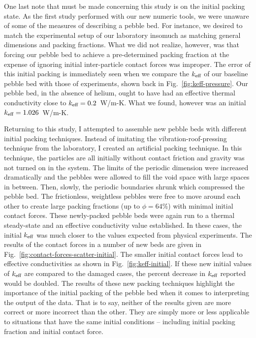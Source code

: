 One last note that must be made concerning this study is on the initial packing state. As the first study performed with our new numeric tools, we were unaware of some of the measures of describing a pebble bed. For instance, we desired to match the experimental setup of our laboratory insomuch as matching general dimensions and packing fractions. What we did not realize, however, was that forcing our pebble bed to achieve a pre-determined packing fraction at the expense of ignoring initial inter-particle contact forces was improper. The error of this initial packing is immediately seen when we compare the $k_\text{eff}$ of our baseline pebble bed with those of experiments, shown back in Fig.~\ref{fig:keff-pressure}. Our pebble bed, in the absence of helium, ought to have had an effective thermal conductivity close to $k_\text{eff} = 0.2$~W/m-K. What we found, however was an initial $k_\text{eff} = 1.026$~W/m-K.

Returning to this study, I attempted to assemble new pebble beds with different initial packing techniques. Instead of imitating the vibration-roof-pressing technique from the laboratory, I created an artificial packing technique. In this technique, the particles are all initially without contact friction and gravity was not turned on in the system. The limits of the periodic dimension were increased dramatically and the pebbles were allowed to fill the void space with large spaces in between. Then, slowly, the periodic boundaries shrunk which compressed the pebble bed. The frictionless, weightless pebbles were free to move around each other to create large packing fractions (up to $\phi = 64\%$) with minimal initial contact forces. These newly-packed pebble beds were again run to a thermal steady-state and an effective conductivity value established. In these cases, the initial $k_\text{eff}$ was much closer to the values expected from physical experiments. The results of the contact forces in a number of new beds are given in Fig.~\ref{fig:contact-forces-scatter-initial}. The smaller initial contact forces lead to effective conductivities as shown in Fig.~\ref{fig:keff-initial}. If these new initial values of $k_\text{eff}$ are compared to the damaged cases, the percent decrease in $k_\text{eff}$ reported would be doubled. The results of these new packing techniques highlight the importance of the initial packing of the pebble bed when it comes to interpreting the output of the data. That is to say, neither of the results given are more correct or more incorrect than the other. They are simply more or less applicable to situations that have the same initial conditions -- including initial packing fraction and initial contact force.

